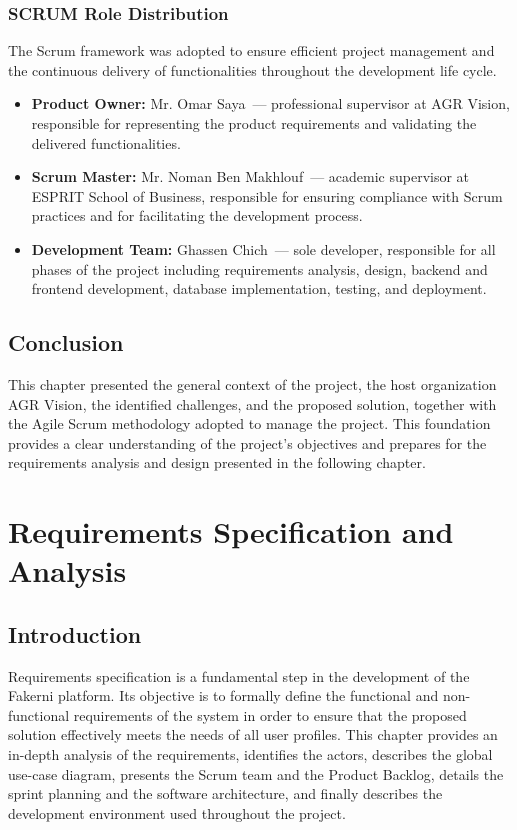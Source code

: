 \documentclass[12pt,a4paper,oneside]{report}
\newcommand{\mySchool}{ESPRIT School of Business}
\newcommand{\myAuthor}{Ghassen Chich}
\newcommand{\myCompany}{AGR Vision}
\newcommand{\myProSupervisor}{Mr. Omar Saya}
\newcommand{\myAcadSupervisor}{Mr. Noman Ben Makhlouf}
\begin{document}
\subsection{SCRUM Role Distribution}
The Scrum framework was adopted to ensure efficient project management and the
continuous delivery of functionalities throughout the development life cycle.
\begin{itemize}[nosep]
  \item \textbf{Product Owner:} \myProSupervisor\ --- professional supervisor at
        \myCompany, responsible for representing the product requirements and
        validating the delivered functionalities.
  \item \textbf{Scrum Master:} \myAcadSupervisor\ --- academic supervisor at
        \mySchool, responsible for ensuring compliance with Scrum practices and
        for facilitating the development process.
  \item \textbf{Development Team:} \myAuthor\ --- sole developer, responsible for
        all phases of the project including requirements analysis, design,
        backend and frontend development, database implementation, testing, and
        deployment.
\end{itemize}

\section*{Conclusion}
This chapter presented the general context of the project, the host organization
\myCompany, the identified challenges, and the proposed solution, together with
the Agile Scrum methodology adopted to manage the project. This foundation
provides a clear understanding of the project's objectives and prepares for the
requirements analysis and design presented in the following chapter.

\chapter{Requirements Specification and Analysis}

\section*{Introduction}
Requirements specification is a fundamental step in the development of the Fakerni
platform. Its objective is to formally define the functional and non-functional
requirements of the system in order to ensure that the proposed solution
effectively meets the needs of all user profiles. This chapter provides an
in-depth analysis of the requirements, identifies the actors, describes the global
use-case diagram, presents the Scrum team and the Product Backlog, details the
sprint planning and the software architecture, and finally describes the
development environment used throughout the project.
\end{document}

